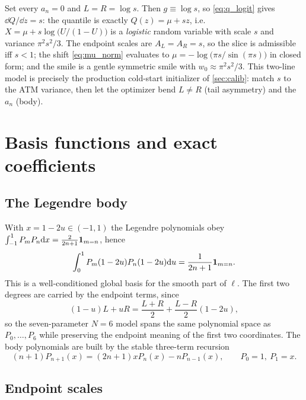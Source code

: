 \documentclass[11pt]{article}
\begin{document}
\begin{example}[title={Example: the logistic base --- the whole machine on one toy}]
Set every $a_n=0$ and $L=R=\log s$. Then $g\equiv\log s$, so
\eqref{eq:q_logit} gives $\dd Q/\dd z=s$: the quantile is exactly
$Q(z)=\mu+sz$, i.e.\ $X=\mu+s\log\!\big(U/(1-U)\big)$ is a \emph{logistic} random variable
with scale $s$ and variance $\pi^2s^2/3$. The endpoint scales are
$A_L=A_R=s$, so the slice is admissible iff $s<1$; the shift
\eqref{eq:mu_norm} evaluates to $\mu=-\log\big(\pi s/\sin(\pi s)\big)$ in
closed form; and the smile is a gentle symmetric smile with
$w_0\approx\pi^2s^2/3$. This two-line model is precisely the production
cold-start initializer of \cref{sec:calib}: match $s$ to the ATM variance,
then let the optimizer bend $L\ne R$ (tail asymmetry) and the $a_n$ (body).
\end{example}

\section{Basis functions and exact coefficients}
\label{sec:basis}

\subsection{The Legendre body}

With $x=1-2u\in(-1,1)$ the Legendre polynomials obey
$\int_{-1}^1 P_mP_n\mathrm{d} x=\frac{2}{2n+1}\mathbf{1}_{m=n}$, hence
\begin{equation}
\int_0^1 P_m(1-2u)P_n(1-2u)\mathrm{d} u=\frac{1}{2n+1}\mathbf{1}_{m=n}.
\end{equation}
This is a well-conditioned global basis for the smooth part of $\ell$. The first
two degrees are carried by the endpoint terms, since
\begin{equation}
(1-u)L+uR=\frac{L+R}{2}+\frac{L-R}{2}(1-2u),
\end{equation}
so the seven-parameter $N=6$ model spans the same polynomial space as
$P_0,\dots,P_6$ while preserving the endpoint meaning of the first two
coordinates. The body polynomials are built by the stable three-term recursion
\begin{equation}
(n+1)P_{n+1}(x)=(2n+1)xP_n(x)-nP_{n-1}(x),\qquad P_0=1,\ P_1=x.
\label{eq:leg_recursion}
\end{equation}

\subsection{Endpoint scales}
\label{sec:endpoint}
\end{document}
